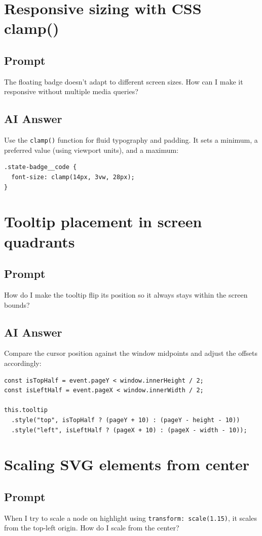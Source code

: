 \documentclass[11pt]{article}
\begin{document}
\section{Responsive sizing with CSS clamp()}
\subsection*{Prompt}
The floating badge doesn't adapt to different screen sizes. How can I make it responsive without multiple media queries?

\subsection*{AI Answer}
Use the \texttt{clamp()} function for fluid typography and padding. It sets a minimum, a preferred value (using viewport units), and a maximum:
\begin{Verbatim}[fontsize=\small]
.state-badge__code {
  font-size: clamp(14px, 3vw, 28px);
}
\end{Verbatim}

\section{Tooltip placement in screen quadrants}
\subsection*{Prompt}
How do I make the tooltip flip its position so it always stays within the screen bounds?

\subsection*{AI Answer}
Compare the cursor position against the window midpoints and adjust the offsets accordingly:
\begin{Verbatim}[fontsize=\small]
const isTopHalf = event.pageY < window.innerHeight / 2;
const isLeftHalf = event.pageX < window.innerWidth / 2;

this.tooltip
  .style("top", isTopHalf ? (pageY + 10) : (pageY - height - 10))
  .style("left", isLeftHalf ? (pageX + 10) : (pageX - width - 10));
\end{Verbatim}

\section{Scaling SVG elements from center}
\subsection*{Prompt}
When I try to scale a node on highlight using \texttt{transform: scale(1.15)}, it scales from the top-left origin. How do I scale from the center?
\end{document}
